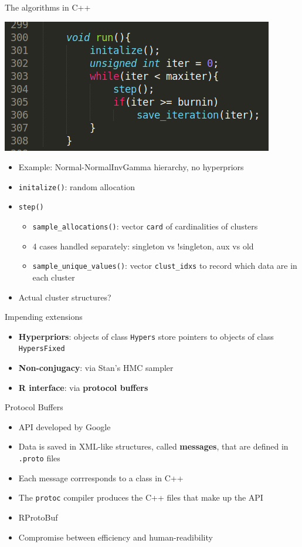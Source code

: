 \begin{frame}{The algorithms in C++}
	\begin{center}
		\includegraphics[scale=0.4]{../etc/neal8_2.png}
	\end{center}
	\begin{itemize}
		\item Example: Normal-NormalInvGamma hierarchy, no hyperpriors
		\item \texttt{initalize()}: random allocation
		\item \texttt{step()}
		\begin{itemize}
			\item \texttt{sample\_allocations()}: vector \texttt{card} of cardinalities of clusters
			\item 4 cases handled separately: singleton vs !singleton, aux vs old
			\item \texttt{sample\_unique\_values()}: vector \texttt{clust\_idxs} to record which data are in each cluster
		\end{itemize}
		\item Actual cluster structures?
	\end{itemize}
\end{frame}


\begin{frame}{Impending extensions}
	\begin{itemize}
	   \item \textbf{Hyperpriors}: objects of class \texttt{Hypers} store pointers to objects of class \texttt{HypersFixed} %
	   \item \textbf{Non-conjugacy}: via Stan's HMC sampler
	   \item  \textbf{R interface}: via \textbf{protocol buffers}
	\end{itemize}
\end{frame}

\begin{frame}{Protocol Buffers}
	\begin{itemize}
		\item API developed by Google
		\item Data is saved in XML-like structures, called \textbf{messages}, that are defined in \texttt{.proto} files
		\item Each message corrresponds to a class in C++
		\item The \texttt{protoc} compiler produces the C++ files that make up the API
		\item RProtoBuf
		\item Compromise between efficiency and human-readibility
	\end{itemize}
\end{frame}

